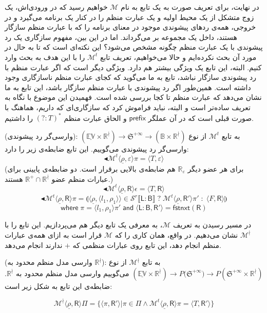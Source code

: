 در نهایت، برای تعریف صورت به یک تابع به نام $\mathcal{M}$ خواهیم رسید که در ورودی‌اش، یک زوج متشکل از یک محیط اولیه و یک عبارت منظم را در کنار یک برنامه می‌گیرد و در خروجی، همه‌ی ردهای پیشوندی موجود در معنای برنامه را که با عبارت منظم سازگار هستند، داخل یک مجموعه بر می‌گرداند.
اما در این بین، مفهوم سازگاری یک رد پیشوندی با یک عبارت منظم چگونه مشخص می‌شود؟ این نکته‌ای است که تا به حال در مورد آن بحث نکرده‌ایم و حالا می‌خواهیم، تعریف تابع $\mathcal{M}^t$ را با این هدف به بحث وارد کنیم. البته، این تابع یک ویژگی بیشتر هم دارد. ویژگی دیگر است که اگر عبارت منظم با رد پیشوندی سازگار نباشد، تابع به ما می‌گوید که کجای عبارت منظم ناسازگاری وجود داشته است. همین‌طور اگر رد پیشوندی با عبارت منظم سازگار باشد، این تابع به ما نشان می‌دهد که عبارت منظم تا کجا بررسی شده است. فهمیدن این موضوع با نگاه به تعریف ساده‌تر است و البته، نباید فراموش کرد که سازگاری‌ای که داریم، هماهنگ با صورت قبلی است که در آن عملگر 
$\mathsf{prefix}$
و الحاق عبارت منظم
$\mathsf{(?:\mathit{T})^*}$
را داشتیم. 
\begin{defn}
	(وارسی‌گر رد پیشوندی): به تابع $\mathcal{M}^t$ از نوع 
	$\mathbb{(\underline{EV} \times R^\nmid) \rightarrow  \mathfrak{S}^{+\infty}}
	\rightarrow (\mathbb{B \times R^\nmid} ) $
	وارسی‌گر رد پیشوندی می‌گوییم. این تابع ضابطه‌ی زیر را دارد:
	$$\blacktriangleleft\mathcal{M}^t \langle \underline{\rho} , \varepsilon \rangle \pi = 
	\langle \mathit{T} , \varepsilon \rangle$$
	(برای هر عضو دیگر $\mathbb{R_\varepsilon}$ هم ضابطه‌ی بالایی برقرار است. دو ضابطه‌ی پایینی برای عبارات منظم عضو $\mathbb{R^+ \cap R^\nmid}$ هستند.)
	$$\blacktriangleleft\mathcal{M}^t \langle \underline{\rho} , \mathsf{R} \rangle \epsilon = 
	\langle \mathit{T} , \mathsf{R} \rangle$$
	$$\blacktriangleleft\mathcal{M}^t \langle \underline{\rho} , \mathsf{R} \rangle \pi = 
	\llparenthesis \langle \underline{\rho}, \langle l_1, \rho_1 \rangle \rangle \in
	\mathcal{S}^r \llbracket \mathsf{L:B} \rrbracket \; ? \; 
	\mathcal{M}^t \langle \underline{\rho}, \mathsf{R'} \rangle \pi' \; : \; 
	\langle \mathit{F}, \mathsf{R} \rangle \rrparenthesis$$
	$$\mathsf{where}\; \pi=\langle l_1,\rho_1\rangle \pi' \;\mathsf{and}\; 
	\langle \mathsf{L:B,R'}\rangle = \mathsf{fstnxt(R)}$$
	
\end{defn}

در مسیر رسیدن به تعریف $\mathcal{M}$، به معرفی یک تابع دیگر هم می‌پردازیم. این تابع را با
 $\mathcal{M}^\nmid$ 
نشان می‌دهیم. در واقع، همان کاری را که $\mathcal{M}$ قرار است به ازای همه‌ی عبارات منظم انجام دهد، این تابع روی عبارات منظمی که $+$ ندارند انجام می‌دهد.
\begin{defn}
	(وارسی مدل منظم محدود به $\mathbb{R^\nmid}$): به تابع $\mathcal{M}^\nmid$ از نوع \break
	$\mathbb{(\underline{EV} \times R^\nmid)} \rightarrow  \mathit{P}({\mathfrak{S}^{+\infty})}
	\rightarrow \mathit{P}(\mathfrak{S}^{+\infty} \times \mathbb{R}^\nmid ) $
	می‌گوییم وارسی مدل منظم محدود به $\mathbb{R^\nmid}$. ضابطه‌ی این تابع به شکل زیر است:
	
	 $$\mathcal{M}^\nmid \langle \underline{\rho} , \mathsf{R} \rangle \Pi= \{ \langle \pi , \mathsf{R'} \rangle | \pi \in \Pi \land  
	  \mathcal{M}^t \langle \underline{\rho} , \mathsf{R} \rangle \pi =
	 \langle \mathit{T} , \mathsf{R'} \rangle \}$$
\end{defn}


